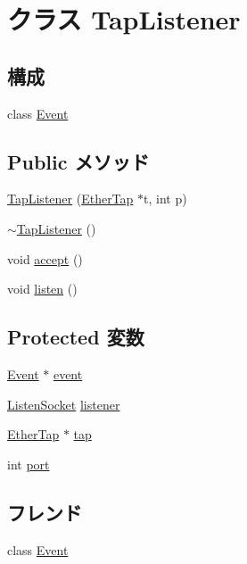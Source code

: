 \hypertarget{classTapListener}{
\section{クラス TapListener}
\label{classTapListener}
}
\subsection*{構成}
\begin{DoxyCompactItemize}
\item 
class \hyperlink{classTapListener_1_1Event}{Event}
\end{DoxyCompactItemize}
\subsection*{Public メソッド}
\begin{DoxyCompactItemize}
\item 
\hyperlink{classTapListener_abbe73917dbac66cd5cbb5546595150ff}{TapListener} (\hyperlink{classEtherTap}{EtherTap} $\ast$t, int p)
\item 
\hyperlink{classTapListener_a7cbe6ce128d9f0afb6d6d0e3da85e283}{$\sim$TapListener} ()
\item 
void \hyperlink{classTapListener_aadb9f3b844fb4cf98288cd3c60a3af91}{accept} ()
\item 
void \hyperlink{classTapListener_a458bbe4cf81360301586b2e62a7f9dd2}{listen} ()
\end{DoxyCompactItemize}
\subsection*{Protected 変数}
\begin{DoxyCompactItemize}
\item 
\hyperlink{classTapListener_1_1Event}{Event} $\ast$ \hyperlink{classTapListener_a765488c8f26c7f8713d5245212dcae01}{event}
\item 
\hyperlink{classListenSocket}{ListenSocket} \hyperlink{classTapListener_acf9ea448b26a541b4a197f1ca92f700b}{listener}
\item 
\hyperlink{classEtherTap}{EtherTap} $\ast$ \hyperlink{classTapListener_afceac4e4f9153ef0f38b7c423422dd2e}{tap}
\item 
int \hyperlink{classTapListener_a63c89c04d1feae07ca35558055155ffb}{port}
\end{DoxyCompactItemize}
\subsection*{フレンド}
\begin{DoxyCompactItemize}
\item 
class \hyperlink{classTapListener_a3c7b3c89bf96f51e80a919b3a82a3915}{Event}
\end{DoxyCompactItemize}


